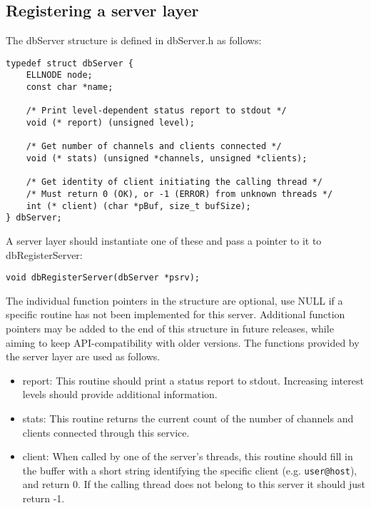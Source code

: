 \subsection{Registering a server layer}

The dbServer structure is defined in dbServer.h as follows:

\begin{verbatim}
typedef struct dbServer {
    ELLNODE node;
    const char *name;

    /* Print level-dependent status report to stdout */
    void (* report) (unsigned level);

    /* Get number of channels and clients connected */
    void (* stats) (unsigned *channels, unsigned *clients);

    /* Get identity of client initiating the calling thread */
    /* Must return 0 (OK), or -1 (ERROR) from unknown threads */
    int (* client) (char *pBuf, size_t bufSize);
} dbServer;
\end{verbatim}

A server layer should instantiate one of these and pass a pointer to it to dbRegisterServer:

\begin{verbatim}
void dbRegisterServer(dbServer *psrv);
\end{verbatim}

The individual function pointers in the structure are optional, use NULL if a specific routine has not been implemented for this server.
Additional function pointers may be added to the end of this structure in future releases, while aiming to keep API-compatibility with older versions.
The functions provided by the server layer are used as follows.

\begin{itemize}

\item {}report: This routine should print a status report to stdout. Increasing interest levels should provide additional information.

\item {}stats: This routine returns the current count of the number of channels and clients connected through this service.

\item {}client: When called by one of the server's threads, this routine should fill in the buffer with a short string identifying the specific client (e.g. \verb|user@host|), and return 0. If the calling thread does not belong to this server it should just return -1.

\end{itemize}

